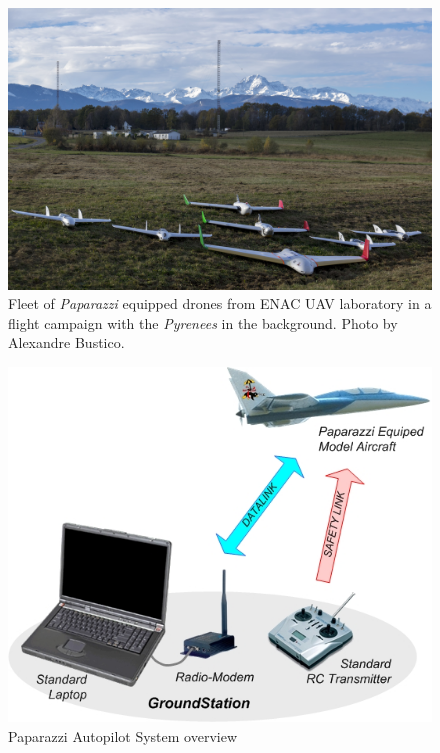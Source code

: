 \begin{figure}[!hbt]
\begin{center}
\includegraphics[width=13.3cm]{figures/ENACdroneFleet}
\caption{Fleet of \emph{Paparazzi} equipped drones from ENAC UAV laboratory in a flight campaign with the \emph{Pyrenees} in the background. Photo by Alexandre Bustico.} 
\label{fig:ENACdroneFleet}
\end{center}
\end{figure}


\begin{figure}[!hbt]
\begin{center}
\includegraphics[width=11.3cm]{figures/Paparazzi_System_overview}
\caption{Paparazzi Autopilot System overview} 
\label{fig:Paparazzi_System_overview}
\end{center}
\end{figure}


